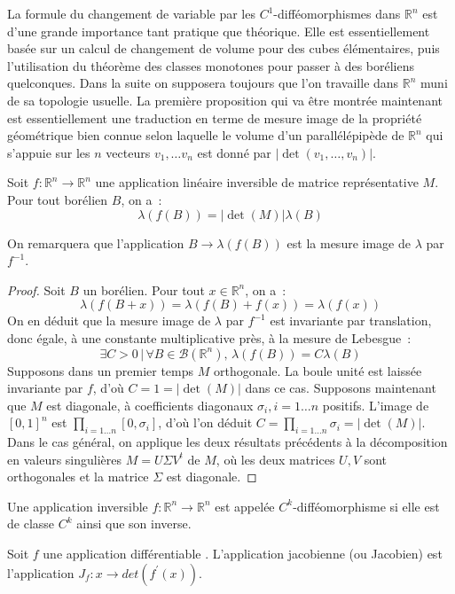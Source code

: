 La formule du changement de variable par les $C^1$-difféomorphismes 
dans $\mathbb{R}^n$ est d'une grande importance tant pratique que
théorique. 
Elle est essentiellement basée sur un calcul de
changement de volume pour des cubes élémentaires, puis l'utilisation
du théorème des classes monotones pour passer à des boréliens
quelconques.
Dans la suite on supposera toujours que l'on travaille dans
$\mathbb{R}^n$ muni de sa topologie usuelle.
La première proposition qui va être montrée maintenant est essentiellement une
traduction en terme de mesure image de la propriété géométrique bien connue
selon laquelle le volume d'un parallélépipède de $\mathbb{R}^n$ qui s'appuie sur
les $n$ vecteurs $v_1,\dots v_n$ est donné par $|\det(v_1,\dots,v_n)|$.
\begin{mandatory}
\begin{prop}
Soit $f \colon \mathbb{R}^n \to \mathbb{R}^n$ une application linéaire
inversible de matrice représentative $M$. Pour tout borélien $B$, on
a~:
\[ 
\lambda(f(B)) = |\det(M)| \lambda(B)
\]
\end{prop}
\end{mandatory}
On remarquera que l'application $B \to \lambda(f(B))$ est la mesure
image de $\lambda$ par $f^{-1}$.
\begin{proof}
Soit $B$ un borélien. Pour tout $x \in \mathbb{R}^n$, on a~:
\[
\lambda(f(B + x)) = \lambda(f(B) + f(x)) = \lambda(f(x))
\]
On en déduit que la mesure image de $\lambda$ par $f^{-1}$ est
invariante par translation, donc égale, à une constante multiplicative
près, à la mesure de Lebesgue~:
\[
\exists C >0 \, | \, \forall B \in \mathcal{B}(\mathbb{R}^n), \, \lambda(f(B)) =
C \lambda(B)
\]
Supposons dans un premier temps $M$ orthogonale. La boule unité est
laissée invariante par $f$, d'où $C = 1 = |\det(M)|$ dans ce cas. Supposons
maintenant que $M$ est diagonale, à coefficients diagonaux $\sigma_i,
i=1\dots n$ positifs. L'image de $[0,1]^n$ est $\prod_{i=1\dots n}
[0, \sigma_i]$, d'où l'on déduit $C = \prod_{i=1\dots n} \sigma_i =
|\det(M)|$. Dans le cas général, on applique les deux résultats
précédents à la décomposition en valeurs singulières $M = U \Sigma
V^t$ de $M$, où les deux matrices $U,V$ sont orthogonales et la matrice $\Sigma$
est diagonale.
\end{proof}
\begin{defn}
Une application inversible $f : \mathbb{R}^n \to \mathbb{R}^n$ est
appelée $C^k$-difféomorphisme si elle est de classe $C^k$ ainsi que
son inverse.
\end{defn}
\begin{term}
Soit $f$ une application différentiable . L'application
jacobienne (ou Jacobien) est l'application $J_f : x \to det(f^\prime(x))$. 
\end{term}
